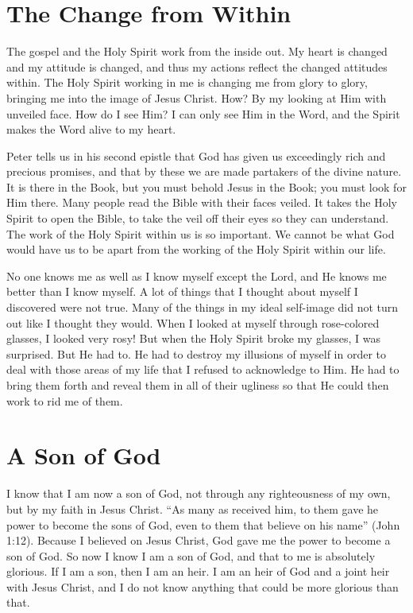 \section*{The Change from Within}

The gospel and the Holy Spirit work from the inside
out. My heart is changed and my attitude is changed, and
thus my actions reflect the changed attitudes within. The
Holy Spirit working in me is changing me from glory to
glory, bringing me into the image of Jesus Christ. How? By
my looking at Him with unveiled face. How do I see Him?
I can only see Him in the Word, and the Spirit makes the
Word alive to my heart.

Peter tells us in his second epistle that God has given us
exceedingly rich and precious promises, and that by these
we are made partakers of the divine nature. It is there in the
Book, but you must behold Jesus in the Book; you must look
for Him there. Many people read the Bible with their faces
veiled. It takes the Holy Spirit to open the Bible, to take the
veil off their eyes so they can understand. The work of the
Holy Spirit within us is so important. We cannot be what
God would have us to be apart from the working of the
Holy Spirit within our life.

No one knows me as well as I know myself except the
Lord, and He knows me better than I know myself. A lot
of things that I thought about myself I discovered were not
true. Many of the things in my ideal self-image did not turn
out like I thought they would. When I looked at myself
through rose-colored glasses, I looked very rosy! But when
the Holy Spirit broke my glasses, I was surprised. But He
had to. He had to destroy my illusions of myself in order
to deal with those areas of my life that I refused to acknowledge
to Him. He had to bring them forth and reveal them in
all of their ugliness so that He could then work to rid me of
them.


\section*{A Son of God}

I know that I am now a son of God, not through any
righteousness of my own, but by my faith in Jesus Christ.
“As many as received him, to them gave he power to
become the sons of God, even to them that believe on his
name” (John 1:12). Because I believed on Jesus Christ, God
gave me the power to become a son of God. So now I know
I am a son of God, and that to me is absolutely glorious. If
I am a son, then I am an heir. I am an heir of God and a
joint heir with Jesus Christ, and I do not know anything that
could be more glorious than that.

